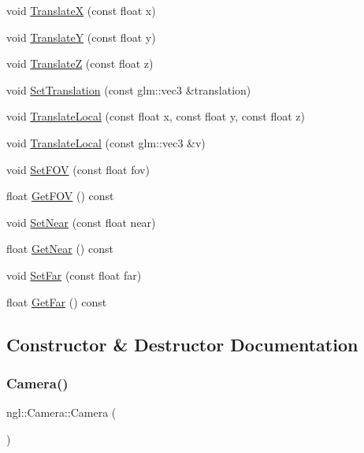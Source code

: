 \begin{DoxyCompactItemize}
\item 
void \mbox{\hyperlink{classngl_1_1_camera_a7fbd37a79260912d80fad6cb262586c0}{TranslateX}} (const float x)
\item 
void \mbox{\hyperlink{classngl_1_1_camera_ae04d720aa999b98b627914250d2449e4}{TranslateY}} (const float y)
\item 
void \mbox{\hyperlink{classngl_1_1_camera_a4397c28c84c25c1cb7779907368e5e3f}{TranslateZ}} (const float z)
\item 
void \mbox{\hyperlink{classngl_1_1_camera_ab72058f059ca32bde90c5553c786f231}{Set\+Translation}} (const glm\+::vec3 \&translation)
\item 
void \mbox{\hyperlink{classngl_1_1_camera_a9c320643e3eb9ab10215d05ac9fc6681}{Translate\+Local}} (const float x, const float y, const float z)
\item 
void \mbox{\hyperlink{classngl_1_1_camera_a5d24f674c2e0026da4fb5c96f43ee792}{Translate\+Local}} (const glm\+::vec3 \&v)
\item 
void \mbox{\hyperlink{classngl_1_1_camera_aadffcc153c8eda07844c96a532201fc4}{Set\+F\+OV}} (const float fov)
\item 
float \mbox{\hyperlink{classngl_1_1_camera_a807d672d58d7bc086291d6819ab38548}{Get\+F\+OV}} () const
\item 
void \mbox{\hyperlink{classngl_1_1_camera_a0b960bedee2fac8b56a1cff0f733234e}{Set\+Near}} (const float near)
\item 
float \mbox{\hyperlink{classngl_1_1_camera_a5c2aa8906d05678bf32a1ad30659d164}{Get\+Near}} () const
\item 
void \mbox{\hyperlink{classngl_1_1_camera_a77d83d87914b5acc5e1a8f3b5defd561}{Set\+Far}} (const float far)
\item 
float \mbox{\hyperlink{classngl_1_1_camera_a565e0be162cf8475a00e572cf8950499}{Get\+Far}} () const
\end{DoxyCompactItemize}


\subsection{Constructor \& Destructor Documentation}
\mbox{\label{classngl_1_1_camera_a4b3487b40f710b295a35181896e6514b}} 
\subsubsection{\texorpdfstring{Camera()}{Camera()}}
{\footnotesize\ttfamily ngl\+::\+Camera\+::\+Camera (\begin{DoxyParamCaption}{ }\end{DoxyParamCaption})\hspace{0.3cm}{\ttfamily [explicit]}}


